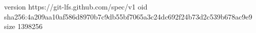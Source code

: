 version https://git-lfs.github.com/spec/v1
oid sha256:4a209aa10af586d8970b7c9db55bf7065a3c24dc692f24b73d2c539b678ac9e9
size 1398256
